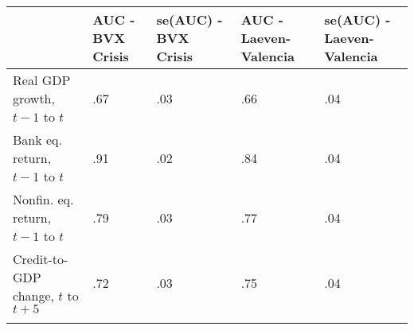 \begin{table}[tbp] \centering
{}

{\small
\begin{tabularx}{6in}{l C C C C}

\toprule
{}&{AUC - BVX Crisis}&{se(AUC) - BVX Crisis}&{AUC - Laeven-Valencia}&{se(AUC) - Laeven-Valencia} \tabularnewline
\midrule\addlinespace[1.5ex]
Real GDP growth, \(t-1\) to \(t\)&.67&.03&.66&.04 \tabularnewline
Bank eq. return, \(t-1\) to \(t\)&.91&.02&.84&.04 \tabularnewline
Nonfin. eq. return, \(t-1\) to \(t\)&.79&.03&.77&.04 \tabularnewline
Credit-to-GDP change, \(t\) to \(t+5\)&.72&.03&.75&.04 \tabularnewline
\bottomrule \addlinespace[1.5ex]

\end{tabularx}
}
\end{table}

